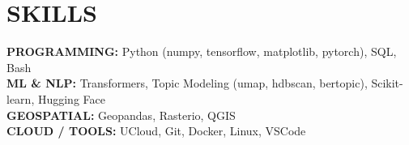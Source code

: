 \documentclass{resume}
\begin{document}
\section{SKILLS} 
\begin{content}
    {\bf PROGRAMMING:} Python {\footnotesize (numpy, tensorflow, matplotlib, pytorch)}, SQL, Bash \\
    {\bf ML \& NLP:} Transformers, Topic Modeling {\footnotesize (umap, hdbscan, bertopic)}, Scikit-learn, Hugging Face \\
    {\bf GEOSPATIAL:} Geopandas, Rasterio, QGIS \\
    {\bf CLOUD / TOOLS:} UCloud, Git, Docker, Linux, VSCode
\end{content}
\end{document}
